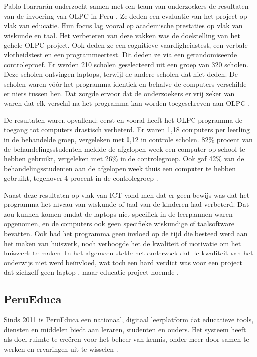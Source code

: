 Pablo Ibarrarán onderzocht samen met een team van onderzoekers de resultaten van de invoering van OLPC in Peru \autocite{Ibarraran2012}. Ze deden een evaluatie van het project op vlak van educatie. Hun focus lag vooral op academische prestaties op vlak van wiskunde en taal. Het verbeteren van deze vakken was de doelstelling van het gehele OLPC project. Ook deden ze een cognitieve vaardigheidstest, een verbale vlotheidstest en een programmeertest. Dit deden ze via een gerandomiseerde controleproef. Er werden 210 scholen geselecteerd uit een groep van 320 scholen. Deze scholen ontvingen laptops, terwijl de andere scholen dat niet deden. De scholen waren vóór het programma identiek en behalve de computers verschilde er niets tussen hen. Dat zorgde ervoor dat de onderzoekers er vrij zeker van waren dat elk verschil na het programma kan worden toegeschreven aan OLPC \autocite{Ibarraran2012}.

De resultaten waren opvallend: eerst en vooral heeft het OLPC-programma de toegang tot computers drastisch verbeterd. Er waren 1,18 computers per leerling in de behandelde groep, vergeleken met 0,12 in controle scholen. 82\% procent van de behandelingsstudenten meldde de afgelopen week een computer op school te hebben gebruikt, vergeleken met 26\% in de controlegroep. Ook gaf 42\% van de behandelingsstudenten aan de afgelopen week thuis een computer te hebben gebruikt, tegenover 4 procent in de controlegroep \autocite{Ibarraran2012}.

Naast deze resultaten op vlak van ICT vond men dat er geen bewijs was dat het programma het niveau van wiskunde of taal van de kinderen had verbeterd. Dat zou kunnen komen omdat de laptops niet specifiek in de leerplannen waren opgenomen, en de computers ook geen specifieke wiskundige of taalsoftware bevatten. Ook had het programma geen invloed op de tijd die besteed werd aan het maken van huiswerk, noch verhoogde het de kwaliteit of motivatie om het huiswerk te maken. In het algemeen stelde het onderzoek dat de kwaliteit van het onderwijs niet werd beïnvloed, wat toch een hard verdict was voor een project dat zichzelf geen laptop-, maar educatie-project noemde \autocite{Ibarraran2012}.

\subsection{PeruEduca}
Sinds 2011 is PeruEduca een nationaal, digitaal leerplatform dat educatieve tools, diensten en middelen biedt aan leraren, studenten en ouders. Het systeem heeft als doel ruimte te creëren voor het beheer van kennis, onder meer door samen te werken en ervaringen uit te wisselen \autocite{EducationPeru2020}.

